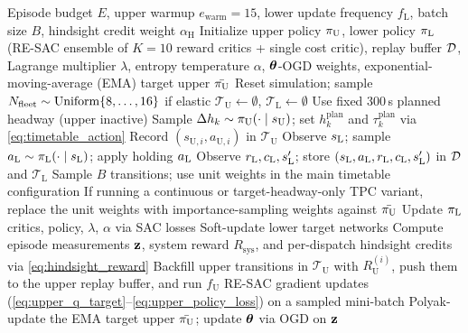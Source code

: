 \begin{algorithm}[t]
\caption{TransitDuet training procedure}
\label{alg:training}
\begin{algorithmic}[1]
\REQUIRE Episode budget $E$, upper warmup $e_{\mathrm{warm}} = 15$, lower update frequency $f_{\mathrm{L}}$, batch size $B$, hindsight credit weight $\alpha_{\mathrm{H}}$
    \STATE Initialize upper policy $\pi_{\mathrm{U}}$, lower policy $\pi_{\mathrm{L}}$ (RE-SAC ensemble of $K{=}10$ reward critics + single cost critic), replay buffer $\mathcal{D}$, Lagrange multiplier $\lambda$, entropy temperature $\alpha$, $\boldsymbol{\theta}$-OGD weights, exponential-moving-average (EMA) target upper $\bar{\pi_{\mathrm{U}}}$
    \STATE Reset simulation; sample $N_{\mathrm{fleet}} \sim \mathrm{Uniform}\{8, \ldots, 16\}$ if elastic
    \STATE $\mathcal{T}_{\mathrm{U}} \leftarrow \emptyset$, $\mathcal{T}_{\mathrm{L}} \leftarrow \emptyset$
                \STATE Use fixed $300$\,s planned headway (upper inactive)
            \ELSE
                \STATE Sample $\Delta h_k \sim \pi_{\mathrm{U}}(\cdot\mid s_{\mathrm{U}})$; set $h^{\mathrm{plan}}_k$ and $\tau^{\mathrm{plan}}_k$ via \cref{eq:timetable_action}
                \STATE Record $(s_{\mathrm{U},i}, a_{\mathrm{U},i})$ in $\mathcal{T}_{\mathrm{U}}$
            \ENDIF
        \ENDIF
            \STATE Observe $s_{\mathrm{L}}$; sample $a_{\mathrm{L}} \sim \pi_{\mathrm{L}}(\cdot \mid s_{\mathrm{L}})$; apply holding $a_{\mathrm{L}}$
            \STATE Observe $r_{\mathrm{L}}, c_{\mathrm{L}}, s_{\mathrm{L}}'$; store $(s_{\mathrm{L}}, a_{\mathrm{L}}, r_{\mathrm{L}}, c_{\mathrm{L}}, s_{\mathrm{L}}')$ in $\mathcal{D}$ and $\mathcal{T}_{\mathrm{L}}$
                \STATE Sample $B$ transitions; use unit weights in the main timetable configuration
                \STATE If running a continuous or target-headway-only TPC variant, replace the unit weights with importance-sampling weights against $\bar{\pi_{\mathrm{U}}}$
                \STATE Update $\pi_{\mathrm{L}}$ critics, policy, $\lambda$, $\alpha$ via SAC losses
                \STATE Soft-update lower target networks
            \ENDIF
        \ENDIF
    \ENDWHILE
    \STATE Compute episode measurements $\mathbf{z}$, system reward $R_{\mathrm{sys}}$, and per-dispatch hindsight credits via \cref{eq:hindsight_reward}
    \STATE Backfill upper transitions in $\mathcal{T}_{\mathrm{U}}$ with $R_{\mathrm{U}}^{(i)}$, push them to the upper replay buffer, and run $f_{\mathrm{U}}$ RE-SAC gradient updates (\cref{eq:upper_q_target}--\ref{eq:upper_policy_loss}) on a sampled mini-batch
    \STATE Polyak-update the EMA target upper $\bar{\pi_{\mathrm{U}}}$; update $\boldsymbol{\theta}$ via OGD on $\mathbf{z}$
\ENDFOR
\end{algorithmic}
\end{algorithm}

